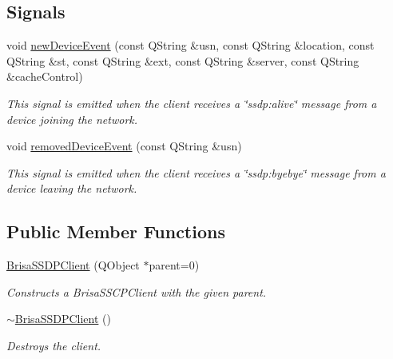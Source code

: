 \subsection*{Signals}
\begin{DoxyCompactItemize}
\item 
void \hyperlink{classBrisaUpnp_1_1BrisaSSDPClient_adc61d6338504d3e47dc68712bbd77b23}{newDeviceEvent} (const QString \&usn, const QString \&location, const QString \&st, const QString \&ext, const QString \&server, const QString \&cacheControl)
\begin{DoxyCompactList}\small\item\em This signal is emitted when the client receives a \char`\"{}ssdp:alive\char`\"{} message from a device joining the network. \item\end{DoxyCompactList}\item 
void \hyperlink{classBrisaUpnp_1_1BrisaSSDPClient_a332ac8038acc5271fb662239eca70599}{removedDeviceEvent} (const QString \&usn)
\begin{DoxyCompactList}\small\item\em This signal is emitted when the client receives a \char`\"{}ssdp:byebye\char`\"{} message from a device leaving the network. \item\end{DoxyCompactList}\end{DoxyCompactItemize}
\subsection*{Public Member Functions}
\begin{DoxyCompactItemize}
\item 
\hyperlink{classBrisaUpnp_1_1BrisaSSDPClient_ae4f2ffbb21c38ea917730898c976b45d}{BrisaSSDPClient} (QObject $\ast$parent=0)
\begin{DoxyCompactList}\small\item\em Constructs a BrisaSSCPClient with the given parent. \item\end{DoxyCompactList}\item 
\hyperlink{classBrisaUpnp_1_1BrisaSSDPClient_a36f414fee62097836c79895460e330bc}{$\sim$BrisaSSDPClient} ()
\begin{DoxyCompactList}\small\item\em Destroys the client. \item\end{DoxyCompactList}\end{DoxyCompactItemize}


